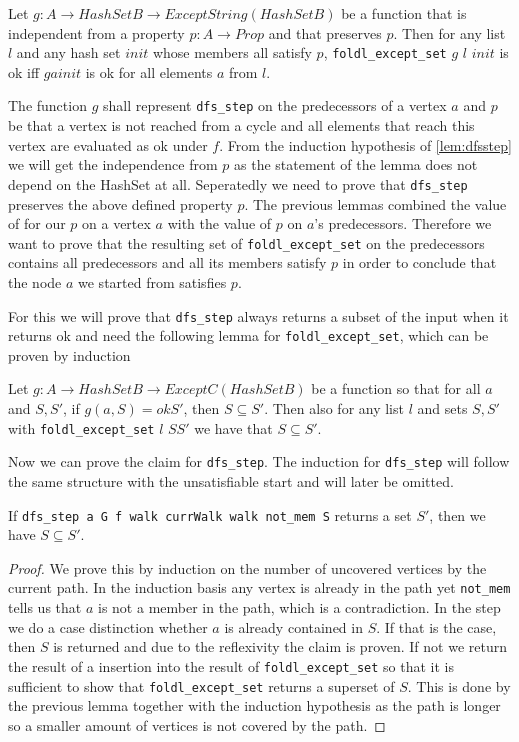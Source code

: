\begin{lemma}\label{lem:fes_ok}
    Let $g: A \to HashSet B \to Except String (HashSet B)$ be a function that is independent from a property $p: A \to Prop$ and that preserves $p$. Then for any list $l$ and any hash set $init$ whose members all satisfy $p$, \texttt{foldl\_except\_set} $g$ $l$ $init$ is ok iff $g a init$ is ok for all elements $a$ from $l$.
\end{lemma}

The function $g$ shall represent \texttt{dfs\_step} on the predecessors of a vertex $a$ and $p$ be that a vertex is not reached from a cycle and all elements that reach this vertex are evaluated as ok under $f$. From the induction hypothesis of \ref{lem:dfsstep} we will get the independence from $p$ as the statement of the lemma does not depend on the HashSet at all. Seperatedly we need to prove that \texttt{dfs\_step} preserves the above defined property $p$. The previous lemmas combined the value of for our $p$ on a vertex $a$ with the value of $p$ on $a$'s predecessors. Therefore we want to prove that the resulting set of \texttt{foldl\_except\_set} on the predecessors contains all predecessors and all its members satisfy $p$ in order to conclude that the node $a$ we started from satisfies $p$.

For this we will prove that \texttt{dfs\_step} always returns a subset of the input when it returns ok and need the following lemma for \texttt{foldl\_except\_set}, which can be proven by induction
\begin{lemma}
    Let $g: A \to HashSet B \to Except C (HashSet B)$ be a function so that for all $a$ and $S, S'$, if $g(a,S) = ok S'$, then $S \subseteq S'$. Then also for any list $l$ and sets $S, S'$ with \texttt{foldl\_except\_set} $l$ $S S'$ we have that $S \subseteq S'$.
\end{lemma}

Now we can prove the claim for \texttt{dfs\_step}. The induction for \texttt{dfs\_step} will follow the same structure with the unsatisfiable start and will later be omitted.

\begin{lemma}
    If \texttt{dfs\_step a G f walk currWalk walk not\_mem S} returns a set $S'$, then we have $S \subseteq S'$.
\end{lemma}
\begin{proof}
    We prove this by induction on the number of uncovered vertices by the current path. In the induction basis any vertex is already in the path yet \texttt{not\_mem} tells us that $a$ is not a member in the path, which is a contradiction.
    In the step we do a case distinction whether $a$ is already contained in $S$. If that is the case, then $S$ is returned and due to the reflexivity the claim is proven.
    If not we return the result of a insertion into the result of \texttt{foldl\_except\_set} so that it is sufficient to show that \texttt{foldl\_except\_set} returns a superset of $S$. This is done by the previous lemma together with the induction hypothesis as the path is longer so a smaller amount of vertices is not covered by the path.
\end{proof}

